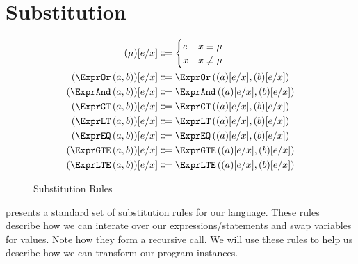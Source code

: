 \section{Substitution}\label{sec:substitution}

\begin{figure}[ht]
  \centering
\begin{align*}
  \subst{\mu}{e}{x}
  &
    \Coloneqq
    \begin{cases}
      e&x\equiv\mu\\
      x&x\not\equiv\mu\\
    \end{cases}
  \\
  \subst{\exprOr{a}{b}}{e}{x}&\Coloneqq\exprOr{\subst{a}{e}{x}}{\subst{b}{e}{x}}\\
  \subst{\exprAnd{a}{b}}{e}{x}&\Coloneqq\exprAnd{\subst{a}{e}{x}}{\subst{b}{e}{x}}\\
  \subst{\exprGT{a}{b}}{e}{x}&\Coloneqq\exprGT{\subst{a}{e}{x}}{\subst{b}{e}{x}}\\
  \subst{\exprLT{a}{b}}{e}{x}&\Coloneqq\exprLT{\subst{a}{e}{x}}{\subst{b}{e}{x}}\\
  \subst{\exprEQ{a}{b}}{e}{x}&\Coloneqq\exprEQ{\subst{a}{e}{x}}{\subst{b}{e}{x}}\\
  \subst{\exprGTE{a}{b}}{e}{x}&\Coloneqq\exprGTE{\subst{a}{e}{x}}{\subst{b}{e}{x}}\\
  \subst{\exprLTE{a}{b}}{e}{x}&\Coloneqq\exprLTE{\subst{a}{e}{x}}{\subst{b}{e}{x}}
\end{align*}
  \caption{\label{fig:subst}Substitution Rules}
\end{figure}

 presents a standard set of substitution rules for our language.
These rules describe how we can interate over our expressions/statements and swap variables for values.
Note how they form a recursive call.
We will use these rules to help us describe how we can transform our program instances.
